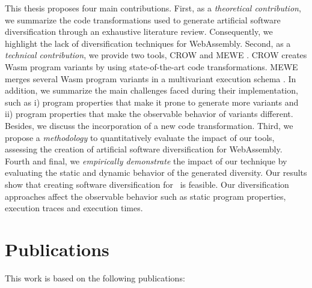This thesis proposes four main contributions. First, as a \emph{theoretical contribution}, we summarize the code transformations used to generate artificial software diversification through an exhaustive literature review. Consequently, we highlight the lack of diversification techniques for WebAssembly.
Second, as a \emph{technical contribution}, we provide two tools, CROW \cite{CROW} and MEWE \cite{MEWE}. CROW creates 
Wasm program variants by using state-of-the-art code transformations.
MEWE merges several Wasm program variants in a multivariant execution schema \cite{okhravi2013survey}.
In addition, we summarize the main challenges faced during their implementation, such as i) program properties that make it prone to generate more variants and ii) program properties that make the observable behavior of variants different. 
Besides, we discuss the incorporation of a new code transformation. 
Third, we propose a \emph{methodology} to quantitatively evaluate the impact of our tools, assessing the creation of artificial software diversification for WebAssembly. 
Fourth and final, we \emph{empirically demonstrate} the impact of our technique by evaluating the static and dynamic behavior of the generated diversity.
Our results show that creating software diversification  for \wasm\ is feasible. 
Our diversification approaches affect the observable behavior such as static program properties, execution traces and execution times.

\pagebreak
\section{Publications}

This work is based on the following publications:

